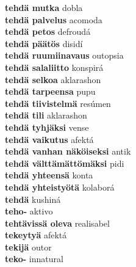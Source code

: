 \textbf{ tehdä mutka  } dobla \\
\textbf{ tehdä palvelus  } acomoda \\
\textbf{ tehdä petos  } defroudá \\
\textbf{ tehdä päätös  } disidí \\
\textbf{ tehdä ruumiinavaus  } outopsia \\
\textbf{ tehdä salaliitto  } konspirá \\
\textbf{ tehdä selkoa  } aklarashon \\
\textbf{ tehdä tarpeensa  } pupu \\
\textbf{ tehdä tiivistelmä  } resúmen \\
\textbf{ tehdä tili  } aklarashon \\
\textbf{ tehdä tyhjäksi  } vense \\
\textbf{ tehdä vaikutus  } afektá \\
\textbf{ tehdä vanhan näköiseksi  } antik \\
\textbf{ tehdä välttämättömäksi  } pidi \\
\textbf{ tehdä yhteensä  } konta \\
\textbf{ tehdä yhteistyötä  } kolaborá \\
\textbf{ tehdä  } kushiná \\
\textbf{ teho-  } aktivo \\
\textbf{ tehtävissä oleva  } realisabel \\
\textbf{ tekeytyä  } afektá \\
\textbf{ tekijä  } outor \\
\textbf{ teko-  } innatural \\
